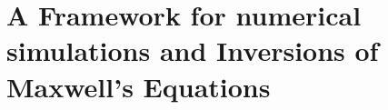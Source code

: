 
\chapter{A Framework for numerical simulations and Inversions of Maxwell’s Equations}
\label{ch:richards}

